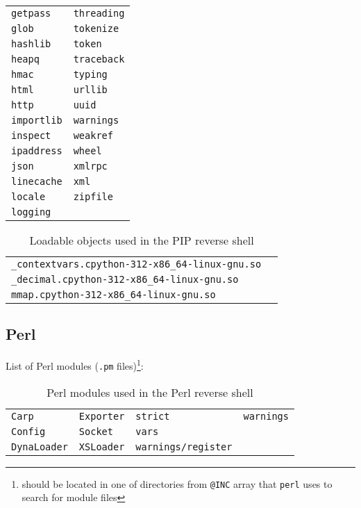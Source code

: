\begin{longtable}{l l}
\texttt{getpass} & \texttt{threading} \\
\texttt{glob} & \texttt{tokenize} \\
\texttt{hashlib} & \texttt{token} \\
\texttt{heapq} & \texttt{traceback} \\
\texttt{hmac} & \texttt{typing} \\
\texttt{html} & \texttt{urllib} \\
\texttt{http} & \texttt{uuid} \\
\texttt{importlib} & \texttt{warnings} \\
\texttt{inspect} & \texttt{weakref} \\
\texttt{ipaddress} & \texttt{wheel} \\
\texttt{json} & \texttt{xmlrpc} \\
\texttt{linecache} & \texttt{xml} \\
\texttt{locale} & \texttt{zipfile} \\
\texttt{logging} & \\
\end{longtable}

\begin{longtable}{l l}
\caption{Loadable objects used in the PIP reverse shell}\label{tab:pip-dpd-so} \\
\texttt{\_contextvars.cpython-312-x86\_64-linux-gnu.so} \\
\texttt{\_decimal.cpython-312-x86\_64-linux-gnu.so} \\
\texttt{mmap.cpython-312-x86\_64-linux-gnu.so} \\
\end{longtable}


\subsection*{Perl}


List of Perl modules (\texttt{.pm} files)\footnote{should be located in one of directories from \texttt{@INC} array that \texttt{perl} uses to search for module files}:

\begin{longtable}{l l l l}
\caption{Perl modules used in the Perl reverse shell}\label{tab:perl-dpd} \\
\texttt{Carp} & \texttt{Exporter} & \texttt{strict} & \texttt{warnings} \\
\texttt{Config} & \texttt{Socket} & \texttt{vars} \\
\texttt{DynaLoader} & \texttt{XSLoader} & \texttt{warnings/register} \\
\end{longtable}


